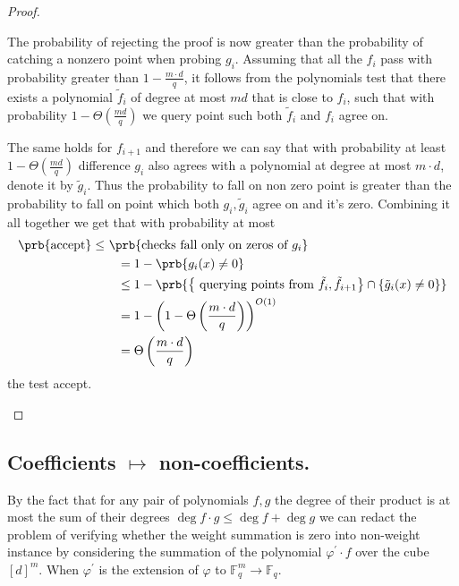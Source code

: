 \documentclass{article}
\newcommand{\FF}{\mathbb{F}_{q}}
\begin{document}
\begin{proof}
\begin{enumerate}
      The probability of rejecting the proof is now greater than the probability of catching a nonzero point when probing $g_{i}$. Assuming that all the $f_{i}$ pass with probability greater than $1 - \frac{m\cdot d}{q}$, it follows from the polynomials test that there exists a polynomial $\tilde{f}_{i}$ of degree at most $md$ that is close to $f_{i}$, such that with probability $1 - \Theta(\frac{md}{q})$ we query point such both $\tilde{f}_{i}$ and $f_{i}$ agree on.


      The same holds for $f_{i+1}$ and therefore we can say that with probability at least $1 - \Theta(\frac{md}{q})$ difference $g_{i}$ also agrees with a polynomial at degree at most $m\cdot d$, denote it by $\tilde{g}_{i}$. Thus the probability to fall on non zero point is greater than the probability to fall on point which both $g_{i},\tilde{g}_{i}$ agree on and it's zero. Combining it all together we get that with probability at most 
      \begin{equation*}
        \begin{split}
          \prb{\text{accept}} \le \  & \prb{\text{checks fall only on zeros of } g_{i}} \\
          & \ \ = 1 - \prb{ g_{i}(x) \neq 0 } \\ 
          & \ \ \le  1 - \prb{ \left\{ \text{ querying points from } \tilde{f}_{i}, \tilde{f}_{i+1}  \right\} \cap \left\{  \tilde{g}_i(x) \neq 0 \right\} } \\
          & \ \ =  1 - \left( 1 - \Theta\left(\frac{m\cdot d}{q} \right) \right)^{O(1)} \\ 
          & \ \ = \Theta\left(\frac{m\cdot d}{q} \right)
        \end{split}
      \end{equation*}
    the test accept.


  \end{enumerate}
\end{proof}

\subsection{ Coefficients $\mapsto$ non-coefficients. }
By the fact that for any pair of polynomials $f,g$ the degree of their product is at most the sum of their degrees  $\deg f \cdot g \le \deg f + \deg g$  we can redact the problem of verifying whether the weight summation is zero into non-weight instance by considering the summation of the polynomial $\varphi^{\prime} \cdot f$ over the cube $[d]^{m}$. When $\varphi^{\prime}$ is the extension of $\varphi$  to $\FF^{m} \rightarrow \FF$. 
\end{document}
